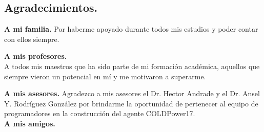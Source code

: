 \begin{center}
	\section*{Agradecimientos.}   
\end{center}
\setcounter{page}{1}

\textbf{A mi familia.}
Por haberme apoyado durante todos mis estudios y poder contar con ellos siempre.

\textbf{A mis profesores.}
\\
A todos mis maestros que ha sido parte de mi formación académica, aquellos que siempre vieron un potencial en mí y me motivaron a superarme.

\textbf{A mis asesores.}
Agradezco a mis asesores el Dr. Hector Andrade y el Dr. Ansel Y. Rodríguez González por brindarme la oportunidad de pertenecer al equipo de programadores en la construcción del agente COLDPower17.
\\

\textbf{A mis amigos.}
